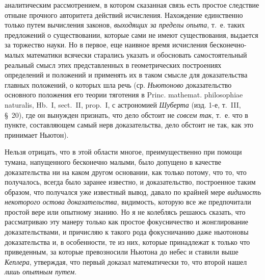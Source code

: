 аналитическим рассмотрением, в котором сказанная связь есть простое следствие
отныне прочного авторитета действий исчисления. Нахождение единственно только
путем вычисления законов, {\em выходящих за пределы опыта}, т.~е. таких
предложений о существовании, которые сами не имеют существования, выдается за
торжество науки. Но в первое, еще наивное время исчисления бесконечно-малых
математики всячески старались указать и обосновать самостоятельный реальный
смысл этих представленных в геометрических построениях определений и положений
и применять их в таком смысле для доказательства главных положений, о которых
шла речь (ср. {\em Ньютоново} доказательство основного положения его теории
тяготения в Princ. mathemat. philosophiae naturalis, Hb.~I, sect.~II, prop.~I,
с астрономией {\em Шуберта} (изд. 1-е, т.~III, \S~20), где он вынужден
признать, что дело обстоит не {\em совсем так}, т.~е. что в пункте,
составляющем самый нерв доказательства, дело обстоит не так,
как это принимает Ньютон).

Нельзя отрицать, что в этой области многое, преимущественно при помощи тумана,
напущенного бесконечно малыми, было допущено в качестве доказательства ни на
каком другом основании, как только потому, что то, что получалось, всегда было
заранее известно, и доказательство, построенное таким образом, что получался
уже известный вывод, давало по крайней мере {\em видимость некоторого остова
доказательства}, видимость, которую все же предпочитали простой вере или
опытному знанию. Но я не колеблясь решаюсь сказать, что рассматриваю эту манеру
только как простое фокусничество и жонглирование доказательствами, и причисляю
к такого рода фокусничанию даже ньютоновы доказательства и, в особенности, те
из них, которые принадлежат к только что приведенным, за которые превозносили
Ньютона до небес и ставили выше {\em Кеплера}, утверждая, что первый доказал
математически то, что второй нашел {\em лишь опытным путем}.

